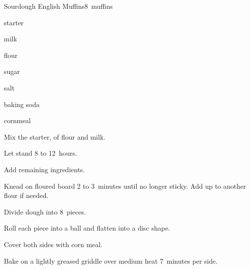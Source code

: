 \begin{recipe}{Sourdough English Muffins}{}{8~muffins}

\begin{ingredients}
\item \C{\half} starter
\item {} milk
\item \C{2 \half} flour
\item {} sugar
\item \tp{\threequarter} salt
\item \tp{\half} baking soda
\item cornmeal
\end{ingredients}

\begin{directions}
\item Mix the starter,  of flour and milk.
\item Let stand 8 to 12~hours.
\item Add remaining ingredients.
\item Knead on floured board 2 to 3~minutes until no longer sticky. Add up to another \C{\quarter} flour if needed.
\item Divide dough into 8~pieces.
\item Roll each piece into a ball and flatten into a disc shape.
\item Cover both sides with corn meal.
\item Bake on a lightly greased griddle over medium heat 7~minutes per side.
\end{directions}

\end{recipe}
